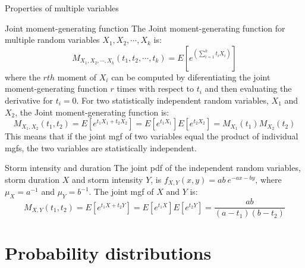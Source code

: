 \documentclass[8pt]{beamer}
\renewcommand{\emph}[1]{\textcolor{myorange}{#1}}
\begin{document}
\begin{frame}{Properties of multiple variables}
    \begin{block}{Joint moment-generating function}
        The \alert{Joint moment-generating function} for multiple random variables $X_1, X_2, \cdots, X_k$ is:
        \[
            M_{X_1, X_2, \cdots, X_k} (t_1, t_2, \cdots, t_k) = E\left[ e^{\left( \sum_{i=1}^k t_i X_i \right)}\right] 
    \]
    where the $rth$ moment of $X_i$ can be computed by diferentiating the joint moment-generating function $r$ times with respect to $t_i$ and then evaluating the derivative for $t_i = 0$. 
    For two statistically independent random variables, $X_1$ and $X_2$, the \emph{Joint moment-generating function} is:
    \[
        M_{X_1, X_2} (t_1, t_2) = E[e^{t_1 X_1 + t_2 X_2}] = E[e^{t_1 X_1}] E[ e^{t_2 X_2} ] = M_{X_1} (t_1) M_{X_2} (t_2)
    \]
    This means that if the joint \emph{mgf} of two variables equal the product of individual \emph{mgf}s, the two variables are \emph{statistically independent}. 
        \end{block}

    \begin{exampleblock}{Storm intensity and duration}
        The joint \emph{pdf} of the independent random variables, storm duration $X$ and storm intensity $Y$, is $f_{X,Y} (x,y) = ab \ e^{-ax-by}$, where $\mu_X = a^{-1}$ and $\mu_Y = b^{-1}$. The joint \emph{mgf} of $X$ and $Y$ is:
        \[
            M_{X,Y} (t_1, t_2) = E \left[ e^{t_1 X + t_2 Y} \right] = E \left[ e^{t_1 X} \right] E \left[ e^{t_2 Y} \right] = \frac{ab}{(a-t_1) (b-t_2)}
        \]

    \end{exampleblock}
\end{frame}


\section{Probability distributions} %
\end{document}
